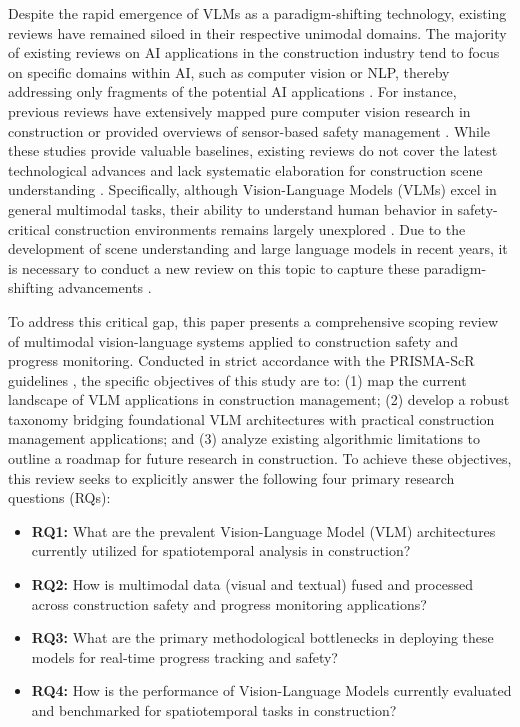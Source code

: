 \documentclass[10pt,letterpaper]{article}
\begin{document}
Despite the rapid emergence of VLMs as a paradigm-shifting technology, existing reviews have remained siloed in their respective unimodal domains. The majority of existing reviews on AI applications in the construction industry tend to focus on specific domains within AI, such as computer vision or NLP, thereby addressing only fragments of the potential AI applications \cite{rabbi2024}. For instance, previous reviews have extensively mapped pure computer vision research in construction \cite{jiang2023,paneru2021,zhong2019} or provided overviews of sensor-based safety management \cite{asadzadeh2020}. While these studies provide valuable baselines, existing reviews do not cover the latest technological advances and lack systematic elaboration for construction scene understanding \cite{zhang2025}. Specifically, although Vision-Language Models (VLMs) excel in general multimodal tasks, their ability to understand human behavior in safety-critical construction environments remains largely unexplored \cite{bui2026}. Due to the development of scene understanding and large language models in recent years, it is necessary to conduct a new review on this topic to capture these paradigm-shifting advancements \cite{zhang2025}.

To address this critical gap, this paper presents a comprehensive scoping review of multimodal vision-language systems applied to construction safety and progress monitoring. Conducted in strict accordance with the PRISMA-ScR guidelines \cite{tricco2018}, the specific objectives of this study are to: (1) map the current landscape of VLM applications in construction management; (2) develop a robust taxonomy bridging foundational VLM architectures with practical construction management applications; and (3) analyze existing algorithmic limitations to outline a roadmap for future research in construction. To achieve these objectives, this review seeks to explicitly answer the following four primary research questions (RQs):

\begin{itemize}
  \item \textbf{RQ1:} What are the prevalent Vision-Language Model (VLM) architectures currently utilized for spatiotemporal analysis in construction?
  \item \textbf{RQ2:} How is multimodal data (visual and textual) fused and processed across construction safety and progress monitoring applications?
  \item \textbf{RQ3:} What are the primary methodological bottlenecks in deploying these models for real-time progress tracking and safety?
  \item \textbf{RQ4:} How is the performance of Vision-Language Models currently evaluated and benchmarked for spatiotemporal tasks in construction?
\end{itemize}
\end{document}
